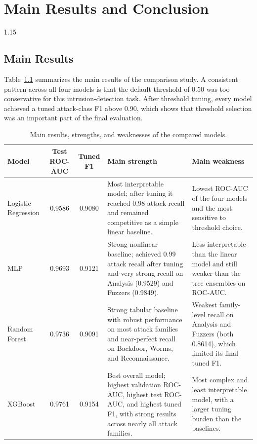 \chapter{Main Results and Conclusion}
\begin{spacing}{1.15}

\section{Main Results}
Table~\ref{tab:main-results-summary} summarizes the main results of the
comparison study. A consistent pattern across all four models is that the
default threshold of 0.50 was too conservative for this intrusion-detection
task. After threshold tuning, every model achieved a tuned attack-class F1
above 0.90, which shows that threshold selection was an important part of the
final evaluation.

\begin{table}[htbp]
    \centering
    \small
    \setlength{\tabcolsep}{4pt}
    \caption{Main results, strengths, and weaknesses of the compared models.}
    \label{tab:main-results-summary}
    \begin{tabularx}{\linewidth}{>{\raggedright\arraybackslash}p{2.2cm} c c X X}
        \toprule
        Model & Test ROC-AUC & Tuned F1 & Main strength & Main weakness \\
        \midrule
        Logistic Regression & 0.9586 & 0.9080 & Most interpretable model; after tuning it reached 0.98 attack recall and remained competitive as a simple linear baseline. & Lowest ROC-AUC of the four models and the most sensitive to threshold choice. \\
        MLP & 0.9693 & 0.9121 & Strong nonlinear baseline; achieved 0.99 attack recall after tuning and very strong recall on Analysis (0.9529) and Fuzzers (0.9849). & Less interpretable than the linear model and still weaker than the tree ensembles on ROC-AUC. \\
        Random Forest & 0.9736 & 0.9091 & Strong tabular baseline with robust performance on most attack families and near-perfect recall on Backdoor, Worms, and Reconnaissance. & Weakest family-level recall on Analysis and Fuzzers (both 0.8614), which limited its final tuned F1. \\
        XGBoost & 0.9761 & 0.9154 & Best overall model; highest validation ROC-AUC, highest test ROC-AUC, and highest tuned F1, with strong results across nearly all attack families. & Most complex and least interpretable model, with a larger tuning burden than the baselines. \\
        \bottomrule
    \end{tabularx}
\end{table}


\end{spacing}
